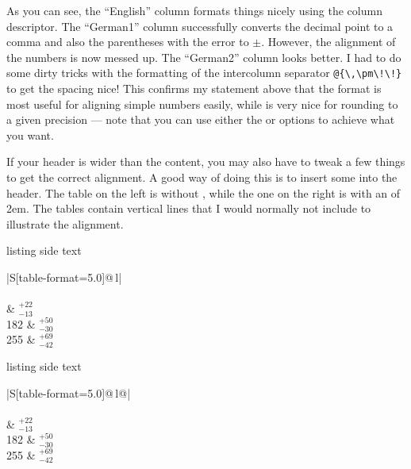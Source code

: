 As you can see, the \enquote{English} column formats things nicely using
the  column descriptor. The \enquote{German1} column successfully
converts the decimal point to a comma and also the parentheses with
the error to \(\pm\). However, the alignment of the numbers is now
messed up. The \enquote{German2} column looks better. I had to do some dirty
tricks with the formatting of the intercolumn separator
\verb+@{\,\pm\!\!}+ to get the spacing nice! This confirms my
statement above that the  format is most useful for aligning
simple numbers easily, while  is very nice for rounding to
a given precision --- note that you can use either the  or
 options to achieve what you want.

If your header is wider than the content,
you may also have to tweak a few things to get the correct alignment.
A good way of doing this is to insert some  into the header.
The table on the left is without , while the one on the right is
with an  of 2em.
The tables contain vertical lines that I would normally not include to illustrate the alignment.
\begin{tcblisting}{listing side text}
  \renewcommand{\arraystretch}{1.4}
  \begin{tabular}{|S[table-format=5.0]@{\,}l|} %
    \toprule
     \\
     \\
     & \(^{+22}_{-13}\) \\
     182 & \(^{+50}_{-30}\) \\
     255 & \(^{+69}_{-42}\) \\
    \bottomrule
  \end{tabular}
\end{tcblisting}

\begin{tcblisting}{listing side text}
  \begin{tabular}{|S[table-format=5.0]@{\,}l@{\hspace*{2em}}|} %
    \toprule
     \\
     \\
     & \(^{+22}_{-13}\) \\
     182 & \(^{+50}_{-30}\) \\
     255 & \(^{+69}_{-42}\) \\
    \bottomrule
  \end{tabular}
\end{tcblisting}


